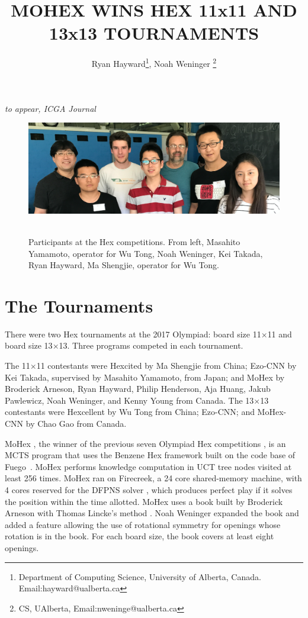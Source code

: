 \documentclass{icga}
\title{\sc MOHEX WINS HEX 11x11 AND 13x13 TOURNAMENTS}
\author{Ryan Hayward\thanks{Department of Computing Science, 
University of Alberta, Canada. Email:hayward@ualberta.ca},
Noah Weninger \thanks{CS, UAlberta, Email:nweninge@ualberta.ca}
}
\affiliation{Edmonton, Canada}
\newif\iflong\longtrue  %
\def\Ec{\mbox{\sc Ezo-CNN}}
\def\Hite{\mbox{\sc Hexcited}}
\def\Hent{\mbox{\sc Hexcellent}}
\def\Mx{\mbox{\sc MoHex}}
\def\Mc{\mbox{\sc MoHex-CNN}}
\def\Fuego{\mbox{\sc Fuego}}
\begin{document}
\maketitle


\vspace*{-2.25in}
{\it to appear, ICGA Journal}
\vspace*{2.0in}

\begin{figure}[hbt]
\includegraphics[width=\columnwidth]{photos/people-1.eps}\
\caption{Participants at the Hex competitions. From left,
Masahito Yamamoto, 
operator for Wu Tong,
Noah Weninger, 
Kei Takada, 
Ryan Hayward, 
Ma Shengjie, 
operator for Wu Tong.} \end{figure}

\section{The Tournaments}
There were two Hex tournaments at the 2017 Olympiad:
board size 11$\times$11 and board size 13$\times$13.
Three programs competed in each tournament.

The 11$\times$11 contestants were
\Hite{} by Ma Shengjie from China;
\Ec{} by Kei Takada, supervised by Masahito Yamamoto, from Japan;
and \Mx{}
by Broderick Arneson, Ryan Hayward, Philip Henderson, Aja Huang, 
Jakub Pawlewicz, Noah Weninger, and Kenny Young from Canada.
The 13$\times$13 contestants were
\Hent{} by Wu Tong from China;
\Ec{}; and
\Mc{} by Chao Gao from Canada.

\Mx{} ,
the winner of the previous seven Olympiad Hex competitions ,
is an MCTS program that uses the Benzene Hex framework
built on the code base of \Fuego\ .
\Mx{} performs knowledge computation 
in UCT tree nodes visited at least 256 times.
\Mx{} ran on Firecreek, a 24 core shared-memory machine, 
with 4 cores reserved for the 
DFPNS solver , which
produces perfect play if it solves the
position within the time allotted.
\Mx{} uses a book built by Broderick Arneson with Thomas Lincke's method 
\citebay{DBLP:conf/cg/Lincke00}. 
Noah Weninger expanded the book and added a feature
allowing the use of rotational symmetry for openings
whose rotation is in the book.
For each board size, the book covers at least eight openings.
\end{document}
